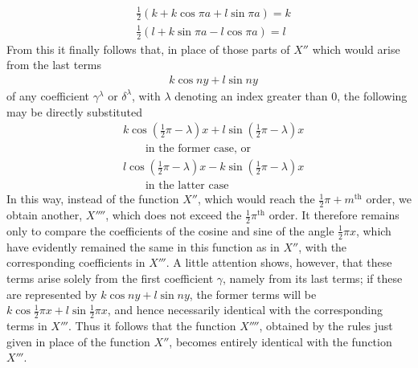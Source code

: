 \[
\begin{aligned}
&\tfrac12(k+k\cos\pi a+l\sin\pi a)=k\\[5pt]
&\tfrac12(l+k\sin\pi a-l\cos\pi a)=l
\end{aligned}
\]
From this it finally follows that, in place of those parts of $X''$ which would arise from the last terms
\[
\begin{aligned}
&k\cos ny+l\sin ny
\end{aligned}
\]
of any coefficient $\gamma^\lambda$ or $\delta^\lambda$,
with $\lambda$ denoting an index greater than 0, the following may be directly substituted
\[
\begin{aligned}
&k\cos(\tfrac12\pi-\lambda)x+l\sin(\tfrac12\pi-\lambda)x\\[5pt]
&\qquad\text{in the former case, or}\\[5pt]
&l\cos(\tfrac12\pi-\lambda)x-k\sin(\tfrac12\pi-\lambda)x\\[5pt]
&\qquad\text{in the latter case}
\end{aligned}
\]
In this way, instead of the function $X''$, which would reach the $\tfrac12\pi+m^{\mathrm{th}}$
order, we obtain another, $X''''$, which does not exceed the $\tfrac12\pi^{\mathrm{th}}$
order. It therefore remains only to compare the coefficients of the cosine and sine of the angle
$\tfrac12\pi x$, which have evidently remained the same in this function as in $X''$, with
the corresponding coefficients in $X'''$. A little attention shows, however,
that these terms arise solely from the first coefficient $\gamma$, namely
from its last terms; if these are represented by $k\cos ny+l\sin ny$, the former terms will be
$k\cos\tfrac12\pi x+l\sin\tfrac12\pi x$, and hence necessarily identical with
the corresponding terms in $X'''$. Thus it follows that the function $X''''$, obtained by
the rules just given in place of the function $X''$, becomes entirely identical with the function $X'''$.

\endgroup
